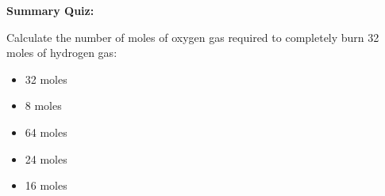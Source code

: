 \vfil \eject

\noindent
{\bf Summary Quiz:}

Calculate the number of moles of oxygen gas required to completely burn 32 moles of hydrogen gas:

\begin{itemize}
\item{} 32 moles
\vskip 5pt 
\item{} 8 moles
\vskip 5pt 
\item{} 64 moles
\vskip 5pt 
\item{} 24 moles
\vskip 5pt 
\item{} 16 moles
\end{itemize}




